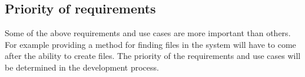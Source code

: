 \subsection{Priority of requirements}

Some of the above requirements and use cases are more important than others. For example providing a method for finding files in the system will have to come after the ability to create files.
The priority of the requirements and use cases will be determined in the development process.
